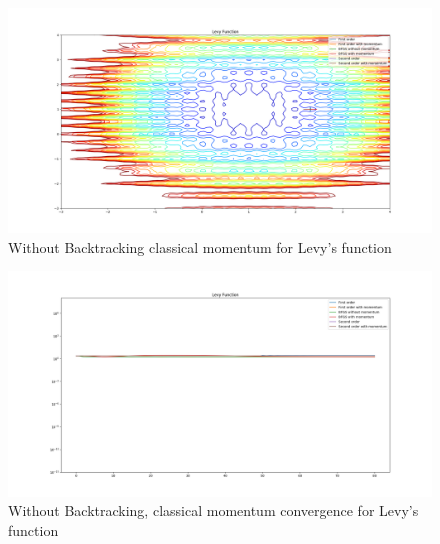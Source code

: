 \documentclass{article}
\begin{document}
\begin{center}
\begin{figure}[H]
	\includegraphics[width=\linewidth]{../Images/levymomentum.png}
	\caption{Without Backtracking classical momentum for Levy's function}
	\label{fig:Without Backtracking classical momentum for Levy's function}
\end{figure}

\begin{figure}[H]
	\includegraphics[width=\linewidth]{../Images/levymomentum1.png}
	\caption{Without Backtracking, classical momentum convergence for Levy's function}
	\label{fig:Without Backtracking, classical momentum convergence for Levy's function}
\end{figure}	


\end{center}
\end{document}
